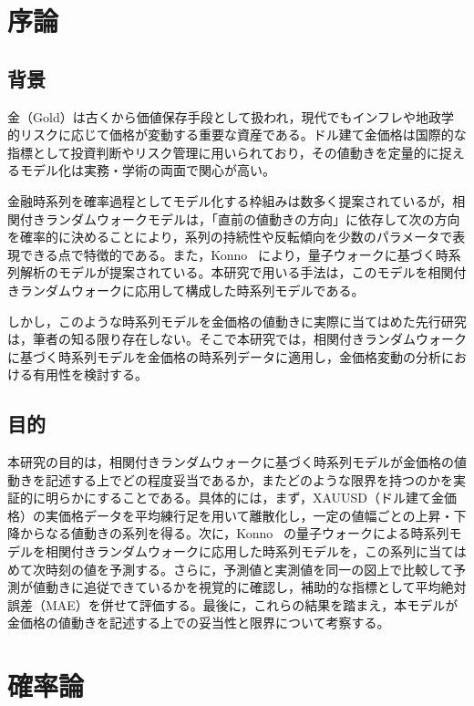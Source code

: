 \documentclass[a4j,dvipdfmx]{jsarticle}
\theoremstyle{plainnote}
\begin{document}


\setcounter{page}{1}

\section{序論}

\subsection{背景}
金（Gold）は古くから価値保存手段として扱われ，現代でもインフレや地政学的リスクに応じて価格が変動する重要な資産である。ドル建て金価格は国際的な指標として投資判断やリスク管理に用いられており，その値動きを定量的に捉えるモデル化は実務・学術の両面で関心が高い。

金融時系列を確率過程としてモデル化する枠組みは数多く提案されているが，相関付きランダムウォークモデルは，「直前の値動きの方向」に依存して次の方向を確率的に決めることにより，系列の持続性や反転傾向を少数のパラメータで表現できる点で特徴的である。また，Konno~\cite{ref3} により，量子ウォークに基づく時系列解析のモデルが提案されている。本研究で用いる手法は，このモデルを相関付きランダムウォークに応用して構成した時系列モデルである。

しかし，このような時系列モデルを金価格の値動きに実際に当てはめた先行研究は，筆者の知る限り存在しない。そこで本研究では，相関付きランダムウォークに基づく時系列モデルを金価格の時系列データに適用し，金価格変動の分析における有用性を検討する。

\subsection{目的}
本研究の目的は，相関付きランダムウォークに基づく時系列モデルが金価格の値動きを記述する上でどの程度妥当であるか，またどのような限界を持つのかを実証的に明らかにすることである。具体的には，まず，XAUUSD（ドル建て金価格）の実価格データを平均練行足を用いて離散化し，一定の値幅ごとの上昇・下降からなる値動きの系列を得る。次に，Konno~\cite{ref3} の量子ウォークによる時系列モデルを相関付きランダムウォークに応用した時系列モデルを，この系列に当てはめて次時刻の値を予測する。さらに，予測値と実測値を同一の図上で比較して予測が値動きに追従できているかを視覚的に確認し，補助的な指標として平均絶対誤差（MAE）を併せて評価する。最後に，これらの結果を踏まえ，本モデルが金価格の値動きを記述する上での妥当性と限界について考察する。

\newpage
\section{確率論}
\end{document}
